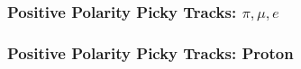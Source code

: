 \subsubsection{Positive Polarity Picky Tracks: $\pi, \mu, e$}\label{sec:Run2PosPickyTrkPiMuE}

\subsubsection{Positive Polarity Picky Tracks: Proton}\label{sec:Run2PosPickyTrkPiMuE}
